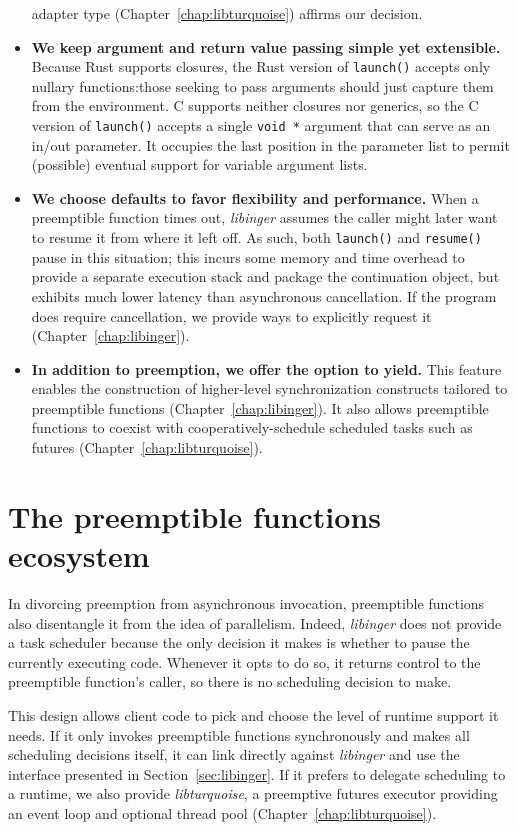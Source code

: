 \begin{itemize}
	adapter type (Chapter~\ref{chap:libturquoise}) affirms our decision.
\item \textbf{We keep argument and return value passing simple yet extensible.}
	Because Rust supports closures, the Rust version of \texttt{launch()} accepts
	only nullary functions:\@ those seeking to pass arguments should just capture
	them from the environment.  C supports neither closures nor generics, so the
	C version of \texttt{launch()} accepts a single \texttt{void *} argument that
	can serve as an in/out parameter.  It occupies the last position in the
	parameter list to permit (possible) eventual support for variable argument
	lists.
\item \textbf{We choose defaults to favor flexibility and performance.}  When a
	preemptible function times out, \textit{libinger} assumes the caller might
	later want to resume it from where it left off.  As such, both
	\texttt{launch()} and \texttt{resume()} pause in this situation; this incurs
	some memory and time overhead to provide a separate execution stack and
	package the continuation object, but exhibits much lower latency than
	asynchronous cancellation.  If the program does require cancellation, we
	provide ways to explicitly request it (Chapter~\ref{chap:libinger}).
\item \textbf{In addition to preemption, we offer the option to yield.} This feature
	enables the construction of higher-level synchronization constructs tailored
	to preemptible functions (Chapter~\ref{chap:libinger}).  It also allows
	preemptible functions to coexist with cooperatively-schedule scheduled tasks
	such as futures (Chapter~\ref{chap:libturquoise}).
\end{itemize}


\section{The preemptible functions ecosystem}

In divorcing preemption from asynchronous invocation, preemptible functions also
disentangle it from the idea of parallelism.  Indeed, \textit{libinger} does not
provide a task scheduler because the only decision it makes is whether to pause the
currently executing code.  Whenever it opts to do so, it returns control to the
preemptible function's caller, so there is no scheduling decision to make.

This design allows client code to pick and choose the level of runtime support it
needs.  If it only invokes preemptible functions synchronously and makes all
scheduling decisions itself, it can link directly against \textit{libinger} and use
the interface presented in Section~\ref{sec:libinger}.  If it prefers to delegate
scheduling to a runtime, we also provide \textit{libturquoise}, a preemptive futures
executor providing an event loop and optional thread pool
(Chapter~\ref{chap:libturquoise}).

